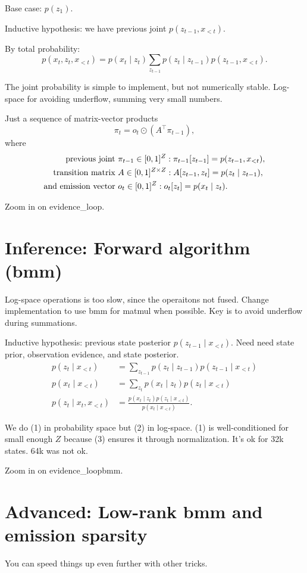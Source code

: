 \documentclass{article}
\begin{document}
Base case: $p(z_1)$.

Inductive hypothesis: we have previous joint $p(z_{t-1}, x_{<t})$.

By total probability:
$$p(x_t, z_t,  x_{<t}) = p(x_t \mid z_t)\sum_{z_{t-1}} p(z_t \mid z_{t-1}) p(z_{t-1}, x_{<t}).$$

The joint probability is simple to implement, but not numerically stable.
Log-space for avoiding underflow, summing very small numbers.

Just a sequence of matrix-vector products
$$
\pi_t = o_t \odot (A^\top\pi_{t-1}),
$$
where
\begin{align*}
\textnormal{previous joint } & \pi_{t-1} \in [0,1]^Z: \pi_{t-1}[z_{t-1}] = p(z_{t-1}, x_{<t}),\\
\textnormal{transition matrix } & A \in [0,1]^{Z\times Z}: A[z_{t-1},z_{t}] = p(z_t \mid z_{t-1}),\\
\textnormal{and emission vector } &  o_t \in [0,1]^Z: o_t[z_t] = p(x_t \mid z_t).
\end{align*}

Zoom in on evidence\_loop.

\section{Inference: Forward algorithm (bmm)}
Log-space operations is too slow, since the operaitons not fused.
Change implementation to use bmm for matmul when possible.
Key is to avoid underflow during summations.

Inductive hypothesis: previous state posterior $p(z_{t-1} \mid x_{<t})$.
Need need state prior, observation evidence, and state posterior.
\begin{align}
p(z_t \mid x_{<t}) &= \sum_{z_{t-1}} p(z_t \mid z_{t-1}) p(z_{t-1} \mid x_{<t}) \\
p(x_t \mid x_{<t}) &= \sum_{z_t} p(x_t \mid z_t)p(z_t \mid x_{<t}) \\
p(z_t \mid x_t, x_{<t}) &= \frac{p(x_t \mid z_t) p(z_t \mid x_{<t})}{p(x_t \mid x_{<t})}.
\end{align}

We do (1) in probability space but (2) in log-space.
(1) is well-conditioned for small enough $Z$ because (3) ensures it through normalization.
It's ok for 32k states. 64k was not ok.

Zoom in on evidence\_loopbmm.

\section{Advanced: Low-rank bmm and emission sparsity}
You can speed things up even further with other tricks.
\end{document}
